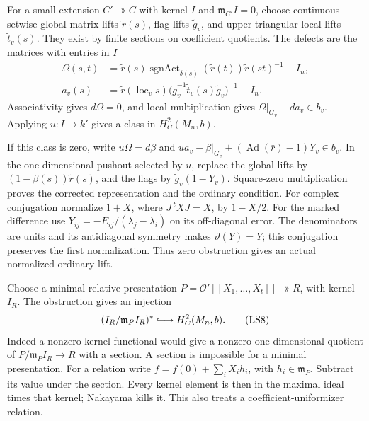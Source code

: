 For a small extension \(C'\twoheadrightarrow C\)
with kernel \(I\) and \(\mathfrak m_{C'}I=0\),
choose continuous setwise global matrix lifts
\(\widetilde r(s)\), flag lifts
\(\widetilde g_v\), and upper-triangular
local lifts \(\widetilde t_v(s)\).
They exist by finite sections on coefficient
quotients.
The defects are the matrices with entries in \(I\)
\[
 \begin{split}
 \Omega(s,t)&=\widetilde r(s)
    \operatorname{sgnAct}_{\delta(s)}(\widetilde r(t))
                                  \widetilde r(st)^{-1}-I_n,\\
 a_v(s)&=\widetilde r(\operatorname{loc}_v s)
   \bigl(\widetilde g_v^{-1}\widetilde t_v(s)
                                      \widetilde g_v\bigr)^{-1}
                                                   -I_n .
 \end{split}                                                  \tag{LS7}
\]
Associativity gives \(d\Omega=0\), and local
multiplication gives
\(\Omega|_{G_v}-da_v\in b_v\).
Applying \(u:I\to k'\) gives a class in
\(H_C^2(M_n,b)\).

If this class is zero, write \(u\Omega=d\beta\)
and
\(ua_v-\beta|_{G_v}
       +(\operatorname{Ad}(\bar r)-1)Y_v\in b_v\).
In the one-dimensional pushout selected by \(u\),
replace the global lifts by
\((1-\beta(s))\widetilde r(s)\), and the flags by
\(\widetilde g_v(1-Y_v)\).
Square-zero multiplication proves the corrected
representation and the ordinary condition.
For complex conjugation normalize \(1+X\),
where \(J\,{}^tXJ=X\), by \(1-X/2\).
For the marked difference use
\(Y_{ij}=-E_{ij}/(\lambda_j-\lambda_i)\)
on its off-diagonal error.
The denominators are units and its
antidiagonal symmetry makes \(\vartheta(Y)=Y\);
this conjugation preserves the first normalization.
Thus zero obstruction gives an actual
normalized ordinary lift.

Choose a minimal relative presentation
\(P=\mathcal O'[[X_1,\ldots,X_t]]\twoheadrightarrow R\),
with kernel \(I_R\).
The obstruction gives an injection
\[
              (I_R/\mathfrak m_PI_R)^*
                   \lhook\joinrel\longrightarrow H_C^2(M_n,b).
                                                               \tag{LS8}
\]
Indeed a nonzero kernel functional would give
a nonzero one-dimensional quotient of
\(P/\mathfrak m_PI_R\to R\) with a section.
A section is impossible for a minimal
presentation.
For a relation write
\(f=f(0)+\sum_iX_i h_i\), with
\(h_i\in\mathfrak m_P\).
Subtract its value under the section.
Every kernel element is then in the maximal
ideal times that kernel; Nakayama kills it.
This also treats a coefficient-uniformizer
relation.

